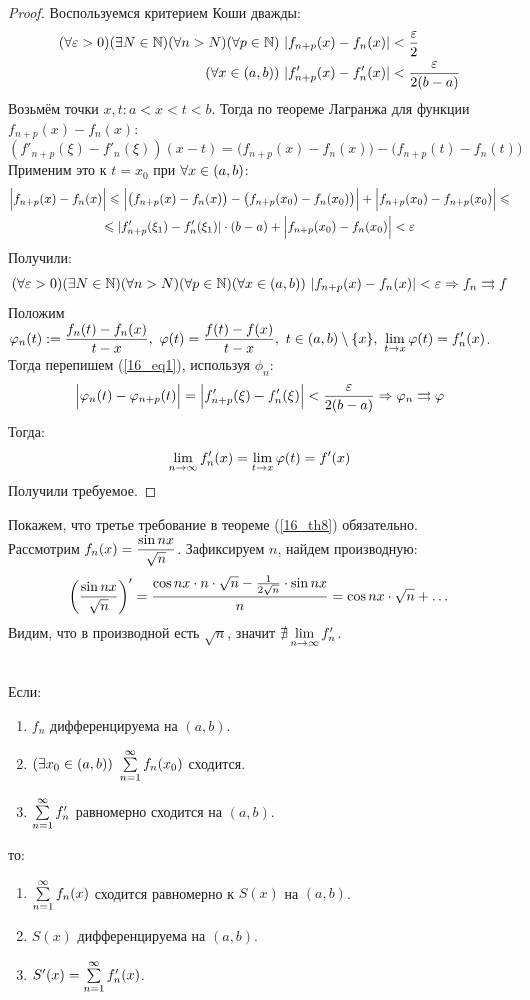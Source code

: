 \begin{proof}
	Воспользуемся критерием Коши дважды:
	\begin{equation*}
		\begin{split}
			(\fa\eps>0)(\ex N\in\N)(\fa n>N)(\fa p\in\N&)\ |f_{n+p}(x)-f_n(x)|<\frac\eps2\\
			(\fa x\in(a,b)&)\ |f'_{n+p}(x)-f'_n(x)|<\frac\eps{2(b-a)}
		\end{split}
	\end{equation*}
	Возьмём точки $x,t:a<x<t<b$. Тогда по теореме Лагранжа для функции $f_{n+p}(x)-f_n(x)$:
	\begin{equation}\label{16_eq1}
		(f'_{n+p}(\xi)-f'_n(\xi))(x-t)=\big(f_{n+p}(x)-f_n(x)\big)-\big(f_{n+p}(t)-f_n(t)\big)
	\end{equation}
	Применим это к $t=x_0$ при $\forall x\in(a,b)$:
	\begin{multline*}
		\Big|f_{n+p}(x)-f_n(x)\Big|\leqslant
		\Big|\big(f_{n+p}(x)-f_n(x)\big)-\big(f_{n+p}(x_0)-f_n(x_0)\big)\Big|+\Big|f_{n+p}(x_0)-f_{n+p}(x_0)\Big|\leqslant\\
		\leqslant|f'_{n+p}(\xi_1)-f'_n(\xi_1)|\cdot(b-a)+\Big|f_{n+p}(x_0)-f_n(x_0)\Big|<\varepsilon
	\end{multline*}
	Получили:
	\[(\forall\varepsilon>0)(\exists N\in\mathbb{N})(\forall n>N)(\forall p\in\mathbb{N})(\forall x\in(a,b))\ |f_{n+p}(x)-f_n(x)|<\varepsilon\Rightarrow f_n\rightrightarrows f\]
	Положим $\ds\phi_n(t):=\frac{f_n(t)-f_n(x)}{t-x},\ \phi(t)=\frac{f(t)-f(x)}{t-x},\ t\in(a,b)\setminus\{x\},\ \lim_{t\ra x}\phi(t)=f'_n(x)$.\\
	Тогда перепишем (\ref{16_eq1}), используя $\phi_n$:
	\[\Big|\varphi_n(t)-\varphi_{n+p}(t)\Big|=\Big|f'_{n+p}(\xi)-f'_n(\xi)\Big|<\frac{\varepsilon}{2(b-a)}\Rightarrow\varphi_n\rightrightarrows\varphi\]
	Тогда:
	\[\lim_{n\ra\i}f'_n(x)=\lim_{t\ra x}\phi(t)=f'(x)\]
	Получили требуемое.
\end{proof}
\begin{example}
	Покажем, что третье требование в теореме (\ref{16_th8}) обязательно.\vspace{0.2cm}\\
	Рассмотрим $\displaystyle f_n(x)=\frac{\sin nx}{\sqrt n}$.
	Зафиксируем $n$, найдем производную:
	\[\left(\frac{\sin nx}{\sqrt n}\right)'=\frac{\cos nx\cdot n\cdot\sqrt n-\frac1{2\sqrt n}\cdot\sin nx}{n}=\cos nx\cdot\sqrt n+\dots\]
	Видим, что в производной есть $\sqrt n$, значит $\nexists\lim_{n\ra\i}f_n'$.
\end{example}
\begin{theorem}\label{16_th8'}\\
	Если:
	\begin{enumerate}
		\item $f_n$ дифференцируема на $(a,b)$.
		\item $(\ex x_0\in(a,b))\ \ss f_n(x_0)$ сходится.
		\item $\ss f'_n$ равномерно сходится на $(a,b)$.
	\end{enumerate}
	то:
	\begin{enumerate}
		\item $\ss f_n(x)$ сходится равномерно к $S(x)$ на $(a,b)$.
		\item $S(x)$ дифференцируема на $(a,b)$.
		\item $S'(x)=\ss f'_n(x)$.
	\end{enumerate}
\end{theorem}
